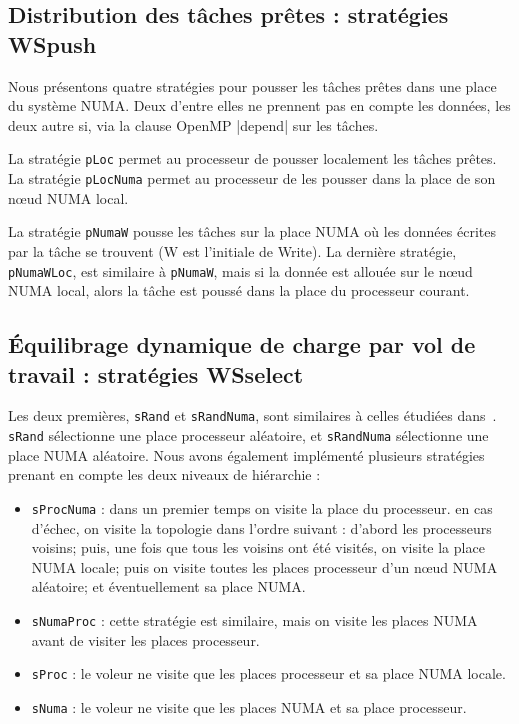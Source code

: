 \documentclass[parallelisme]{compas2016}
\begin{document}
\vspace*{-1ex}
\subsection{Distribution des tâches prêtes : stratégies WSpush}

Nous présentons quatre stratégies pour pousser les tâches prêtes dans une place
du système NUMA. Deux d'entre elles ne prennent pas en compte les données, les deux
autre si, via la clause OpenMP |depend| sur les tâches.

La stratégie \verb/pLoc/ permet au processeur de pousser localement les tâches prêtes.
La stratégie \verb/pLocNuma/ permet au processeur de les pousser dans la place de son nœud NUMA local.

La stratégie \verb/pNumaW/ pousse les tâches sur la place NUMA où les données
écrites par la tâche se trouvent (W est l'initiale de Write).
La dernière stratégie, \verb/pNumaWLoc/, est similaire à \verb/pNumaW/, mais
si la donnée est allouée sur le nœud NUMA local, alors la tâche est poussé dans
la place du processeur courant.


\vspace*{-1ex}
\subsection{Équilibrage dynamique de charge par vol de travail : stratégies WSselect}

Les deux premières, \verb/sRand/ et \verb/sRandNuma/, sont similaires à celles étudiées
dans~\cite{DBLP:journals/ijhpca/OlivierPWSP12}. \verb/sRand/ sélectionne une place
processeur aléatoire, et \verb/sRandNuma/ sélectionne une place NUMA aléatoire.
Nous avons également implémenté plusieurs stratégies prenant en compte les deux niveaux
de hiérarchie :

\begin{itemize}
  \item \verb/sProcNuma/ : dans un premier temps on visite la place du processeur.
    en cas d'échec, on visite la topologie dans l'ordre suivant : d'abord les
    processeurs voisins; puis, une fois que tous les voisins ont été visités, on
    visite la place NUMA locale; puis on visite toutes les places processeur d'un
    nœud NUMA aléatoire; et éventuellement sa place NUMA.
    
  \item \verb/sNumaProc/ : cette stratégie est similaire, mais on visite les places
    NUMA avant de visiter les places processeur.
  \item \verb/sProc/ : le voleur ne visite que les places processeur et sa place
    NUMA locale.
  \item \verb/sNuma/ : le voleur ne visite que les places NUMA et sa place processeur.
\end{itemize}
\end{document}
